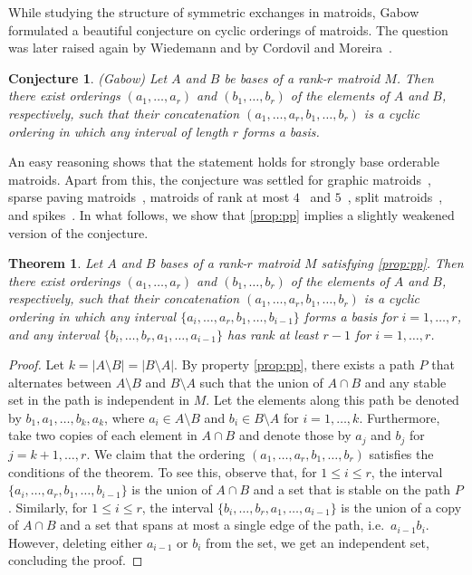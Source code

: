 \documentclass[11pt,a4paper]{article}
\theoremstyle{plain}
\newtheorem{thm}{Theorem}
\newtheorem{conj}{Conjecture}
\theoremstyle{definition}
\begin{document}
While studying the structure of symmetric exchanges in matroids, Gabow~\cite{gabow1976decomposing} formulated a beautiful conjecture on cyclic orderings of matroids. The question was later raised again by Wiedemann \cite{wiedemann1984cyclic} and by Cordovil and Moreira~\cite{cordovil1993bases}.

\begin{conj} {\normalfont (Gabow)} \label{conj:gabow}
Let $A$ and $B$ be bases of a rank-$r$ matroid $M$. Then there exist orderings $(a_1,\dots,a_r)$ and $(b_1,\dots,b_r)$ of the elements of $A$ and $B$, respectively, such that their concatenation $(a_1,\dots,a_r,b_1,\dots,b_r)$ is a cyclic ordering in which any interval of length $r$ forms a basis.
\end{conj}

An easy reasoning shows that the statement holds for strongly base orderable matroids. Apart from this, the conjecture was settled for graphic matroids~\cite{kajitani1988ordering,cordovil1993bases,wiedemann1984cyclic}, sparse paving matroids~\cite{bonin2013basis}, matroids of rank at most $4$~\cite{kotlar2013serial} and $5$~\cite{kotlar2013circuits}, split matroids~\cite{berczi2022exchange}, and spikes~\cite{berczi2022weighted}. In what follows, we show that \ref{prop:pp} implies a slightly weakened version of the conjecture.

\begin{thm} \label{thm:weakgab}
Let $A$ and $B$ bases of a rank-$r$ matroid $M$ satisfying \ref{prop:pp}. Then there exist orderings $(a_1,\dots,a_r)$ and $(b_1,\dots,b_r)$ of the elements of $A$ and $B$, respectively, such that their concatenation $(a_1,\dots,a_r,b_1,\dots,b_r)$ is a cyclic ordering in which any interval $\{a_i,\dots,a_r,b_1,\dots,b_{i-1}\}$ forms a basis for $i=1,\dots,r$, and any interval $\{b_i,\dots,b_r,a_1,\dots,a_{i-1}\}$ has rank at least $r-1$ for $i=1,\dots,r$.
\end{thm}
\begin{proof}
Let $k = |A\setminus B| = |B \setminus A|$. By property \ref{prop:pp}, there exists a path $P$ that alternates between $A\setminus B$ and $B\setminus A$ such that the union of $A\cap B$ and any stable set in the path is independent in $M$. Let the elements along this path be denoted by $b_1,a_1,\dots,b_k,a_k$, where $a_i\in A\setminus B$ and $b_i\in B\setminus A$ for $i=1,\dots,k$. Furthermore, take two copies of each element in $A\cap B$ and denote those by $a_j$ and $b_j$ for $j=k+1,\dots,r$. We claim that the ordering $(a_1,\dots,a_r,b_1,\dots,b_r)$ satisfies the conditions of the theorem. To see this, observe that, for $1\leq i\leq r$, the interval $\{a_i,\dots,a_r,b_1,\dots,b_{i-1}\}$ is the union of $A\cap B$ and a set that is stable on the path $P$. Similarly, for $1\leq i\leq r$, the interval $\{b_i,\dots,b_r,a_1,\dots,a_{i-1}\}$ is the union of a copy of $A\cap B$ and a set that spans at most a single edge of the path, i.e.\ $a_{i-1}b_i$. However, deleting either $a_{i-1}$ or $b_i$ from the set, we get an independent set, concluding the proof. 
\end{proof}
\end{document}
